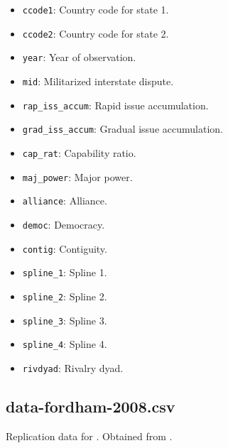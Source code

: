 \documentclass[12pt]{article}
\begin{document}
\begin{itemize}
  \item \texttt{ccode1}: Country code for state 1.
  \item \texttt{ccode2}: Country code for state 2.
  \item \texttt{year}: Year of observation.
  \item \texttt{mid}: Militarized interstate dispute.
  \item \texttt{rap\_iss\_accum}: Rapid issue accumulation.
  \item \texttt{grad\_iss\_accum}: Gradual issue accumulation.
  \item \texttt{cap\_rat}: Capability ratio.
  \item \texttt{maj\_power}: Major power.
  \item \texttt{alliance}: Alliance.
  \item \texttt{democ}: Democracy.
  \item \texttt{contig}: Contiguity.
  \item \texttt{spline\_1}: Spline 1.
  \item \texttt{spline\_2}: Spline 2.
  \item \texttt{spline\_3}: Spline 3.
  \item \texttt{spline\_4}: Spline 4. 
  \item \texttt{rivdyad}: Rivalry dyad.
\end{itemize}

\subsection{data-fordham-2008.csv}

Replication data for \citet{Fordham:2008gs}.
Obtained from \citet{fordham2008data}.
\end{document}
